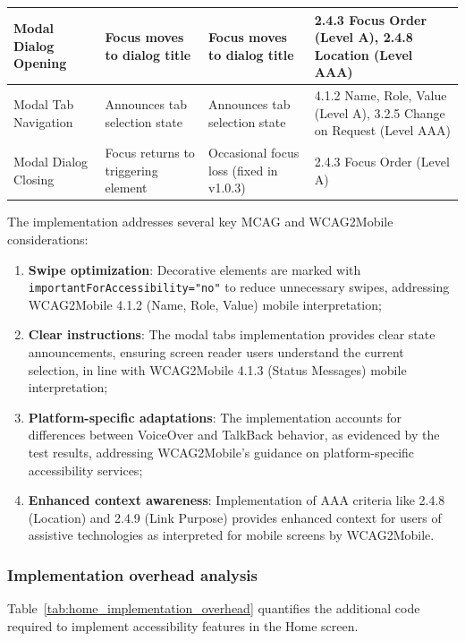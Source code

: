 \begin{longtable}[c]{|C{2.8cm}|C{3.5cm}|C{3.5cm}|C{5cm}|}
\hline
Modal Dialog Opening &  Focus moves to dialog title &  Focus moves to dialog title & 2.4.3 Focus Order (Level A), 2.4.8 Location (Level AAA) \\
\hline
Modal Tab Navigation &  Announces tab selection state &  Announces tab selection state & 4.1.2 Name, Role, Value (Level A), 3.2.5 Change on Request (Level AAA) \\
\hline
Modal Dialog Closing &  Focus returns to triggering element &  Occasional focus loss (fixed in v1.0.3) & 2.4.3 Focus Order (Level A) \\
\end{longtable}

\FloatBarrier

The implementation addresses several key MCAG and WCAG2Mobile considerations:
\begin{enumerate}
    \item \textbf{Swipe optimization}: Decorative elements are marked with \\ \texttt{importantForAccessibility="no"} to reduce unnecessary swipes, addressing \\ WCAG2Mobile 4.1.2 (Name, Role, Value) mobile interpretation;
    
    \item \textbf{Clear instructions}: The modal tabs implementation provides clear state announcements, ensuring screen reader users understand the current selection, in line with WCAG2Mobile 4.1.3 (Status Messages) mobile interpretation;
    
    \item \textbf{Platform-specific adaptations}: The implementation accounts for differences between VoiceOver and TalkBack behavior, as evidenced by the test results, addressing WCAG2Mobile's guidance on platform-specific accessibility services;
    
    \item \textbf{Enhanced context awareness}: Implementation of AAA criteria like 2.4.8 (Location) and 2.4.9 (Link Purpose) provides enhanced context for users of assistive technologies as interpreted for mobile screens by WCAG2Mobile.
\end{enumerate}

\subsubsection{Implementation overhead analysis}

Table~\ref{tab:home_implementation_overhead} quantifies the additional code required to implement accessibility features in the Home screen.

